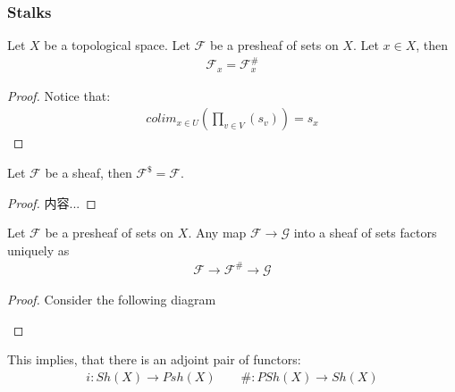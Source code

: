 \documentclass[Total.tex]{subfiles}
\begin{document}
				\subsubsection{Stalks}
				\begin{lemma}
					Let $X$ be a topological space. Let $\mathcal{F}$ be a presheaf of sets on $X$. Let $x\in X$, then
					\begin{gather*}
						\mathcal{F}_x=\mathcal{F}_x^\#
					\end{gather*}
				\end{lemma}
				\begin{proof}
					Notice that:
					\begin{gather*}
						colim_{x\in U} (\prod_{v\in V} (s_v))=s_x
					\end{gather*}
				\end{proof}
				\begin{lemma}
					Let $\mathcal{F}$ be a sheaf, then $\mathcal{F}^\$=\mathcal{F}$.
				\end{lemma}
				\begin{proof}
					内容...
				\end{proof}
				
				\begin{lemma}
					Let $\mathcal{F}$ be a presheaf of sets on $X$. Any map $\mathcal{F}\rightarrow \mathcal{G}$ into a sheaf of sets factors uniquely as
					\begin{gather*}
						\mathcal{F}\rightarrow \mathcal{F}^\#\rightarrow \mathcal{G}
					\end{gather*}
				\end{lemma}
				\begin{proof}
					Consider the following diagram
					\begin{center}
					\end{center}
				\end{proof}
				This implies, that there is an adjoint pair of functors:
				\begin{gather*}
					i:Sh(X)\rightarrow Psh(X)\qquad \#:PSh(X)\rightarrow Sh(X)
				\end{gather*}
				
\end{document}
